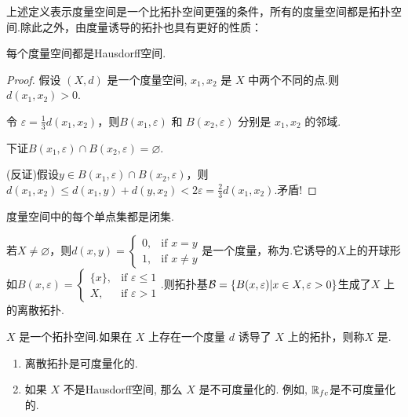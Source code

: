 上述定义表示度量空间是一个比拓扑空间更强的条件，所有的度量空间都是拓扑空间.除此之外，由度量诱导的拓扑也具有更好的性质：
\begin{proposition}[][prop:4.1]
    每个度量空间都是Hausdorff空间.
\end{proposition}
\begin{proof}
    假设 $(X,d)$ 是一个度量空间, $x_1,x_2$ 是 $X$ 中两个不同的点.则$d(x_1,x_2)>0$.\par
    令 $\varepsilon = \frac{1}{3}d(x_1,x_2)$，则$B(x_1,\varepsilon)$ 和 $B(x_2,\varepsilon)$ 分别是 $x_1,x_2$ 的邻域.\par
    下证$B(x_1,\varepsilon)\cap B(x_2,\varepsilon)=\varnothing$.\par
    (反证)假设$y\in B(x_1,\varepsilon)\cap B(x_2,\varepsilon)$，则$d(x_1,x_2)\leq d(x_1,y)+d(y,x_2) < 2\varepsilon = \frac{2}{3}d(x_1,x_2)$.矛盾!
\end{proof}
\begin{corollary}[][cor:4.1]
    度量空间中的每个单点集都是闭集.
\end{corollary}

\begin{instance}
    若$X\neq\varnothing$，则$d(x,y)=\begin{cases} 0, & \text{if } x=y \\ 1, & \text{if } x\neq y \end{cases}$是一个度量，称为.它诱导的$X$上的开球形如$B(x,\varepsilon) = \begin{cases} \{x\}, & \text{if } \varepsilon\leq 1 \\ X, & \text{if } \varepsilon > 1 \end{cases}$.则拓扑基$\mathcal{B}=\{B(x,\varepsilon)|x\in X, \varepsilon>0\}$生成了$X$ 上的离散拓扑.
\end{instance}



\begin{definition}[可度量化][def:4.3]
    $X$ 是一个拓扑空间.如果在 $X$ 上存在一个度量 $d$ 诱导了 $X$ 上的拓扑，则称$X$ 是.
\end{definition}

\begin{instance}
    \begin{enumerate}
        \item 离散拓扑是可度量化的.
        \item 如果 $X$ 不是Hausdorff空间, 那么 $X$ 是不可度量化的. 例如, $\mathbb{R}_{fc}$是不可度量化的.
    \end{enumerate}
\end{instance}
